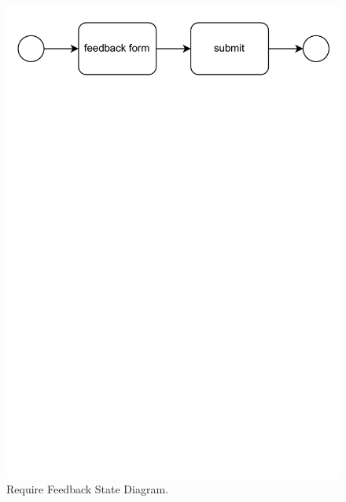 \begin{figure}[H]
    \begin{center}
        \includegraphics[width=\linewidth]{Images/StateDiagram/RequireFeedback.pdf}
        \caption{Require Feedback State Diagram.}
        \label{fig:req_feedback_state_diag}%
    \end{center}
\end{figure}

